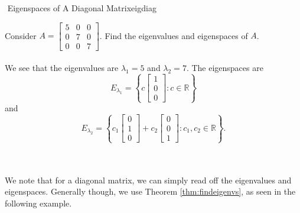         \begin{example}{\Difficulty\,\,Eigenspaces of A Diagonal Matrix}{eigdiag}

            Consider \(A=\begin{bmatrix} 5 & 0 & 0 \\ 0 & 7 & 0 \\ 0 & 0 & 7 \end{bmatrix}\). Find the eigenvalues and eigenspaces of \(A\).
            \\
            \\
            We see that the eigenvalues are \(\lambda_1=5\) and \(\lambda_2=7\). The eigenspaces are
            \begin{equation*}
                E_{\lambda_1}=\left\{c\begin{bmatrix} 1 \\ 0 \\ 0 \end{bmatrix}:c\in\mathbb{R}\right\}
            \end{equation*}
            and
            \begin{equation*}
                E_{\lambda_2}=\left\{c_1\begin{bmatrix} 0 \\ 1 \\ 0 \end{bmatrix}+c_2\begin{bmatrix} 0 \\ 0 \\ 1 \end{bmatrix}:c_1,c_2\in\mathbb{R}\right\}.
            \end{equation*}

        \end{example}
        \pagebreak
        \vphantom
        \\
        \\
        We note that for a diagonal matrix, we can simply read off the eigenvalues and eigenspaces. Generally though, we use Theorem \ref{thm:findeigenvs}, as seen in the following example.
